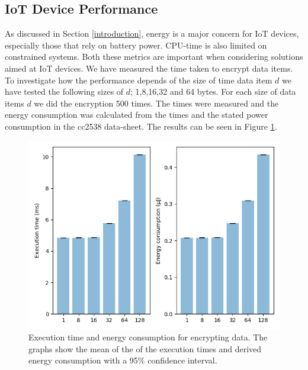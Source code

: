 {\subsection{IoT Device Performance}
As discussed in Section \ref{introduction}, energy is a major concern for IoT devices, especially those that rely on battery power. CPU-time is also limited on constrained systems. Both these metrics are important when considering solutions aimed at IoT devices. We have measured the time taken to encrypt data items. To investigate how the performance depends of the size of time data item $d$ we have tested the following sizes of $d$; 1,8,16,32 and 64 bytes. For each size of data items $d$ we did the encryption 500 times. The times were measured and the energy consumption was calculated from the times and the stated power consumption in the cc2538 data-sheet. The results can be seen in Figure \ref{fig:iot_performance}. %
\begin{figure}[H]
    \includegraphics[width=\linewidth]{papers/ppiot/images/iot_bar_plot.png}
    \caption{Execution time and energy consumption for encrypting data. The graphs show the mean of the of the execution times and derived energy consumption with a 95\% confidence interval.}
    \label{fig:iot_performance}
\end{figure}

}
